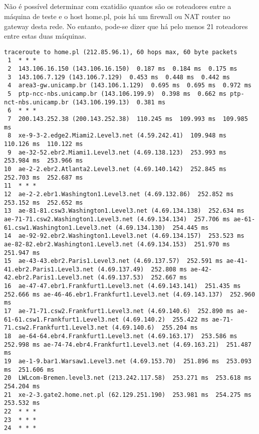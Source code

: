 \documentclass[a4paper,10pt,oneside,final,titlepage,onecolumn]{article}
\begin{document}
\subsection{}
\paragraph{}Não é possível determinar com exatidão quantos são os roteadores entre a máquina de teste e o host \mbox{home.pl}, pois há um firewall ou NAT router no gateway desta rede. No entanto, pode-se dizer que há pelo menos 21 roteadores entre estas duas máquinas.
\begin{lstlisting}
traceroute to home.pl (212.85.96.1), 60 hops max, 60 byte packets
 1  * * *
 2  143.106.16.150 (143.106.16.150)  0.187 ms  0.184 ms  0.175 ms
 3  143.106.7.129 (143.106.7.129)  0.453 ms  0.448 ms  0.442 ms
 4  area3-gw.unicamp.br (143.106.1.129)  0.695 ms  0.695 ms  0.972 ms
 5  ptp-ncc-nbs.unicamp.br (143.106.199.9)  0.398 ms  0.662 ms ptp-nct-nbs.unicamp.br (143.106.199.13)  0.381 ms
 6  * * *
 7  200.143.252.38 (200.143.252.38)  110.245 ms  109.993 ms  109.985 ms
 8  xe-9-3-2.edge2.Miami2.Level3.net (4.59.242.41)  109.948 ms  110.126 ms  110.122 ms
 9  ae-32-52.ebr2.Miami1.Level3.net (4.69.138.123)  253.993 ms  253.984 ms  253.966 ms
10  ae-2-2.ebr2.Atlanta2.Level3.net (4.69.140.142)  252.845 ms  252.703 ms  252.687 ms
11  * * *
12  ae-2-2.ebr1.Washington1.Level3.net (4.69.132.86)  252.852 ms  253.152 ms  252.652 ms
13  ae-81-81.csw3.Washington1.Level3.net (4.69.134.138)  252.634 ms ae-71-71.csw2.Washington1.Level3.net (4.69.134.134)  257.706 ms ae-61-61.csw1.Washington1.Level3.net (4.69.134.130)  254.445 ms
14  ae-92-92.ebr2.Washington1.Level3.net (4.69.134.157)  253.523 ms ae-82-82.ebr2.Washington1.Level3.net (4.69.134.153)  251.970 ms  251.947 ms
15  ae-43-43.ebr2.Paris1.Level3.net (4.69.137.57)  252.591 ms ae-41-41.ebr2.Paris1.Level3.net (4.69.137.49)  252.808 ms ae-42-42.ebr2.Paris1.Level3.net (4.69.137.53)  252.667 ms
16  ae-47-47.ebr1.Frankfurt1.Level3.net (4.69.143.141)  251.435 ms  252.666 ms ae-46-46.ebr1.Frankfurt1.Level3.net (4.69.143.137)  252.960 ms
17  ae-71-71.csw2.Frankfurt1.Level3.net (4.69.140.6)  252.890 ms ae-61-61.csw1.Frankfurt1.Level3.net (4.69.140.2)  255.422 ms ae-71-71.csw2.Frankfurt1.Level3.net (4.69.140.6)  255.204 ms
18  ae-64-64.ebr4.Frankfurt1.Level3.net (4.69.163.17)  253.586 ms  252.998 ms ae-74-74.ebr4.Frankfurt1.Level3.net (4.69.163.21)  251.487 ms
19  ae-1-9.bar1.Warsaw1.Level3.net (4.69.153.70)  251.896 ms  253.093 ms  251.606 ms
20  LWLcom-Bremen.level3.net (213.242.117.58)  253.271 ms  253.618 ms  254.204 ms
21  xe-2-3.gate2.home.net.pl (62.129.251.190)  253.981 ms  254.275 ms  253.532 ms
22  * * *
23  * * *
24  * * *
\end{lstlisting}
\end{document}
